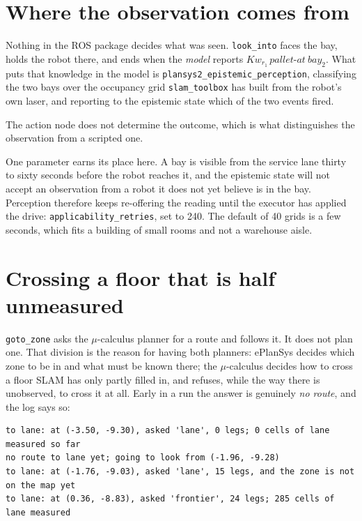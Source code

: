 \documentclass[11pt,a4paper]{article}
\theoremstyle{definition}
\newcommand{\Kw}[1]{\mathit{Kw}_{#1}}
\newcommand{\code}[1]{\texttt{\small #1}}
\begin{document}
\section{Where the observation comes from}

Nothing in the ROS package decides what was seen. \code{look\_into} faces the
bay, holds the robot there, and ends when the \emph{model} reports
$\Kw{r_1}\,\mathit{pallet\text{-}at\ bay_2}$. What puts that knowledge in the
model is \code{plansys2\_epistemic\_perception}, classifying the two bays over
the occupancy grid \code{slam\_toolbox} has built from the robot's own laser,
and reporting to the epistemic state which of the two events fired.

The action node does not determine the outcome, which is what distinguishes the
observation from a scripted one.

One parameter earns its place here. A bay is visible from the service lane
thirty to sixty seconds before the robot reaches it, and the epistemic state
will not accept an observation from a robot it does not yet believe is in the
bay. Perception therefore keeps re-offering the reading until the executor has
applied the drive: \code{applicability\_retries}, set to 240. The default of 40
grids is a few seconds, which fits a building of small rooms and not a
warehouse aisle.

\section{Crossing a floor that is half unmeasured}

\code{goto\_zone} asks the $\mu$-calculus planner for a route and follows it.
It does not plan one. That division is the reason for having both planners:
ePlanSys decides which zone to be in and what must be known there; the
$\mu$-calculus decides how to cross a floor SLAM has only partly filled in, and
refuses, while the way there is unobserved, to cross it at all. Early in a run
the answer is genuinely \emph{no route}, and the log says so:

\begin{lstlisting}
to lane: at (-3.50, -9.30), asked 'lane', 0 legs; 0 cells of lane measured so far
no route to lane yet; going to look from (-1.96, -9.28)
to lane: at (-1.76, -9.03), asked 'lane', 15 legs, and the zone is not on the map yet
to lane: at (0.36, -8.83), asked 'frontier', 24 legs; 285 cells of lane measured
\end{lstlisting}
\end{document}

